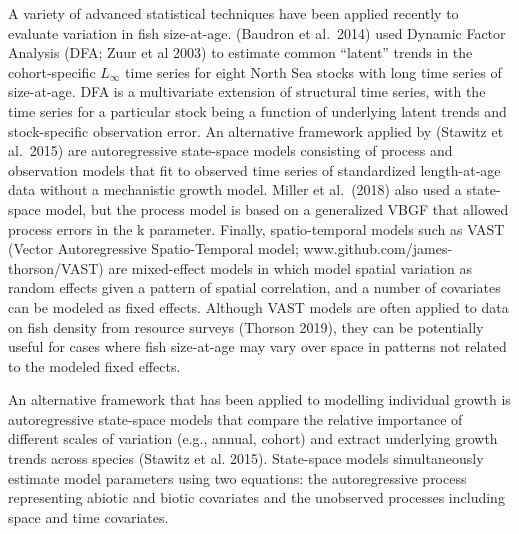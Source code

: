 \documentclass[
]{article}
\begin{document}
A variety of advanced statistical techniques have been applied recently
to evaluate variation in fish size-at-age. (Baudron et al.~2014) used
Dynamic Factor Analysis (DFA; Zuur et al 2003) to estimate common
``latent'' trends in the cohort-specific \(L_\infty\) time series for
eight North Sea stocks with long time series of size-at-age. DFA is a
multivariate extension of structural time series, with the time series
for a particular stock being a function of underlying latent trends and
stock-specific observation error. An alternative framework applied by
(Stawitz et al.~2015) are autoregressive state-space models consisting
of process and observation models that fit to observed time series of
standardized length-at-age data without a mechanistic growth model.
Miller et al.~(2018) also used a state-space model, but the process
model is based on a generalized VBGF that allowed process errors in the
k parameter. Finally, spatio-temporal models such as VAST (Vector
Autoregressive Spatio-Temporal model; www.github.com/james-thorson/VAST)
are mixed-effect models in which model spatial variation as random
effects given a pattern of spatial correlation, and a number of
covariates can be modeled as fixed effects. Although VAST models are
often applied to data on fish density from resource surveys (Thorson
2019), they can be potentially useful for cases where fish size-at-age
may vary over space in patterns not related to the modeled fixed
effects.

An alternative framework that has been applied to modelling individual
growth is autoregressive state-space models that compare the relative
importance of different scales of variation (e.g., annual, cohort) and
extract underlying growth trends across species (Stawitz et al. 2015).
State-space models simultaneously estimate model parameters using two
equations: the autoregressive process representing abiotic and biotic
covariates and the unobserved processes including space and time
covariates.
\end{document}
